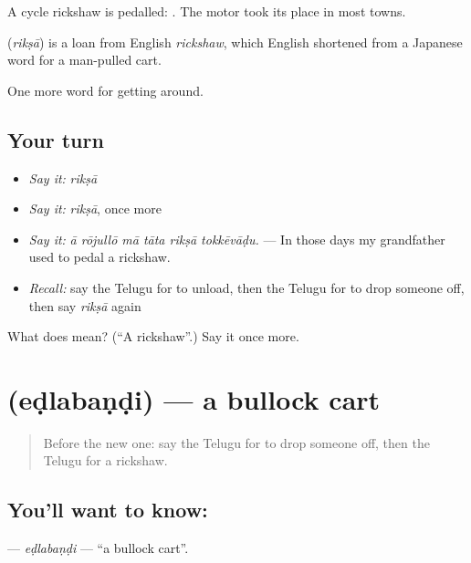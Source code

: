 A cycle rickshaw is pedalled:  . The motor  took its place in most towns.

\begin{cousinweb}
\textbf{} (\emph{rikṣā}) is a loan from English \emph{rickshaw}, which English shortened from a Japanese word for a man-pulled cart.
\end{cousinweb}

\begin{grammarlens}[title={What you've built}]
One more word for getting around.
\end{grammarlens}

\subsection*{Your turn}
\begin{itemize}
\raggedright
  \item \emph{Say it:} \emph{rikṣā}
  \item \emph{Say it:} \emph{rikṣā}, once more
  \item \emph{Say it:} \emph{ā rōjullō mā tāta rikṣā tokkēvāḍu.} — In those days my grandfather used to pedal a rickshaw.
  \item \emph{Recall:} say the Telugu for to unload, then the Telugu for to drop someone off, then say \emph{rikṣā} again
\end{itemize}

\begin{tcolorbox}[breakable,colback=teal!4,colframe=teal!35!black,title={Before you move on}]
What does  mean? (\textquotedblleft{}A rickshaw\textquotedblright{}.) Say it once more.
\end{tcolorbox}
\section[\texorpdfstring{\te{ఎడ్లబండి} (eḍlabaṇḍi)}{ఎడ్లబండి (eḍlabaṇḍi)}]{ (eḍlabaṇḍi) — a bullock cart}

\label{lesson:TE-C451-edlabandi}



\begin{quote}
Before the new one: say the Telugu for to drop someone off, then the Telugu for a rickshaw.
\end{quote}

\subsection*{You'll want to know: }
\textbf{} — \emph{eḍlabaṇḍi} — \textquotedblleft{}a bullock cart\textquotedblright{}.

